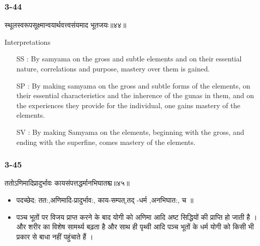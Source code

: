 \begin{frame}[fragile]\frametitle{3-44}
\begin{sanskrit}
स्थूलस्वरूपसूक्ष्मान्वयार्थवत्त्वसंयमाद भूतजयः॥४४॥
\end{sanskrit}

Interpretations
\begin{itemize}	
\item [SS]: By samyama on the gross and subtle elements and on their essential nature, correlations and purpose, mastery over them is gained.
\item [SP]: By making samyama on the gross and subtle forms of the elements, on their essential characteristics and the inherence of the gunas in them, and on the experiences they provide for the individual, one gains mastery of the elements.
\item [SV]: By making Samyama on the elements, beginning with the gross, and ending with the superfine, comes mastery of the elements.
\end{itemize}
\end{frame}

\begin{frame}[fragile]\frametitle{3-45}
\begin{sanskrit}
ततोऽणिमादिप्रादुर्भावः कायसंपत्तद्धर्मानभिघातश्च॥४५॥
\end{sanskrit}

\begin{itemize}
\item पदच्छेद:  तत:,अणिमादि-प्रादुर्भाव:, काय-सम्पत्,तद् -धर्म ,अनभिघात:, च ॥
\item पञ्च भूतों पर विजय प्राप्त करने के बाद योगी को अणिमा आदि अष्ट सिद्धियों की प्राप्ति हो जाती है ।और शरीर का विशेष सामर्थ्य बढ़ता है और साथ ही पृथ्वी आदि पञ्च भूतों के धर्म योगी को किसी भी प्रकार से बाधा नहीं पहुंचाते हैं ।
\end{itemize}
\end{frame}


